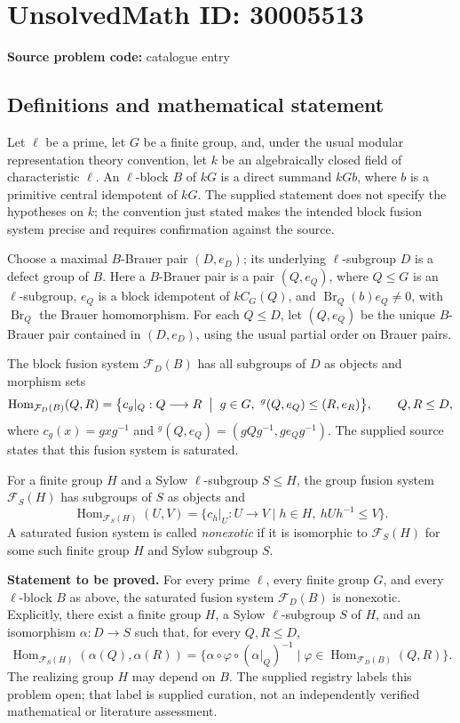 \documentclass[11pt]{article}
\begin{document}
\section*{UnsolvedMath ID: 30005513}
\textbf{Source problem code:} catalogue entry
\subsection{Definitions and mathematical statement}
Let \(\ell\) be a prime, let \(G\) be a finite group, and, under the usual modular representation theory convention, let \(k\) be an algebraically closed field of characteristic \(\ell\). An \(\ell\)-block \(B\) of \(kG\) is a direct summand \(kGb\), where \(b\) is a primitive central idempotent of \(kG\). The supplied statement does not specify the hypotheses on \(k\); the convention just stated makes the intended block fusion system precise and requires confirmation against the source.

Choose a maximal \(B\)-Brauer pair \((D,e_D)\); its underlying \(\ell\)-subgroup \(D\) is a defect group of \(B\). Here a \(B\)-Brauer pair is a pair \((Q,e_Q)\), where \(Q\leq G\) is an \(\ell\)-subgroup, \(e_Q\) is a block idempotent of \(kC_G(Q)\), and \(\operatorname{Br}_Q(b)e_Q\neq 0\), with \(\operatorname{Br}_Q\) the Brauer homomorphism. For each \(Q\leq D\), let \((Q,e_Q)\) be the unique \(B\)-Brauer pair contained in \((D,e_D)\), using the usual partial order on Brauer pairs.

The block fusion system \(\mathcal F_D(B)\) has all subgroups of \(D\) as objects and morphism sets
\[
\operatorname{Hom}_{\mathcal F_D(B)}(Q,R)
=\bigl\{c_g|_Q:Q\longrightarrow R\;\bigm|\;
 g\in G,\ {}^g(Q,e_Q)\leq(R,e_R)\bigr\},
\qquad Q,R\leq D,
\]
where \(c_g(x)=gxg^{-1}\) and \({}^g(Q,e_Q)=(gQg^{-1},ge_Qg^{-1})\). The supplied source states that this fusion system is saturated.

For a finite group \(H\) and a Sylow \(\ell\)-subgroup \(S\leq H\), the group fusion system \(\mathcal F_S(H)\) has subgroups of \(S\) as objects and
\[
\operatorname{Hom}_{\mathcal F_S(H)}(U,V)
=\{c_h|_U:U\longrightarrow V\mid h\in H,\ hUh^{-1}\leq V\}.
\]
A saturated fusion system is called \emph{nonexotic} if it is isomorphic to \(\mathcal F_S(H)\) for some such finite group \(H\) and Sylow subgroup \(S\).

\textbf{Statement to be proved.} For every prime \(\ell\), every finite group \(G\), and every \(\ell\)-block \(B\) as above, the saturated fusion system \(\mathcal F_D(B)\) is nonexotic. Explicitly, there exist a finite group \(H\), a Sylow \(\ell\)-subgroup \(S\) of \(H\), and an isomorphism \(\alpha:D\longrightarrow S\) such that, for every \(Q,R\leq D\),
\[
\operatorname{Hom}_{\mathcal F_S(H)}(\alpha(Q),\alpha(R))
=\bigl\{\alpha\circ\varphi\circ(\alpha|_Q)^{-1}
\mid \varphi\in\operatorname{Hom}_{\mathcal F_D(B)}(Q,R)\bigr\}.
\]
The realizing group \(H\) may depend on \(B\). The supplied registry labels this problem open; that label is supplied curation, not an independently verified mathematical or literature assessment.
\end{document}
